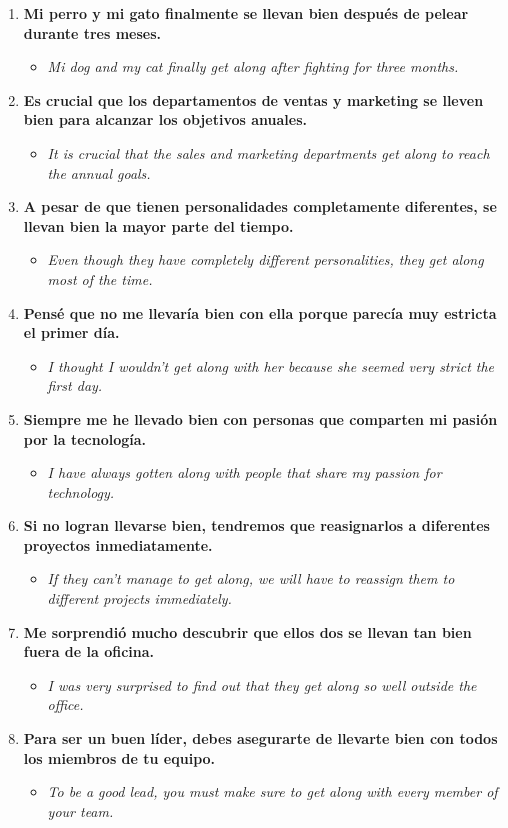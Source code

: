 \documentclass[
10pt, %
a4paper, %
oneside, %
headinclude,footinclude, %
BCOR5mm, %
]{scrartcl}
\begin{document}
\begin{enumerate}
\begin{itemize}
	\end{itemize}
	\item \textbf{Mi perro y mi gato finalmente se llevan bien después de pelear durante tres meses.}
	\begin{itemize}
		\item \textit{Mi dog and my cat finally get along after fighting for three months.}
	\end{itemize}
	\item \textbf{Es crucial que los departamentos de ventas y marketing se lleven bien para alcanzar los objetivos anuales.}
	\begin{itemize}
		\item \textit{It is crucial that the sales and marketing departments get along to reach the annual goals.}
	\end{itemize}
	\item \textbf{A pesar de que tienen personalidades completamente diferentes, se llevan bien la mayor parte del tiempo.}
	\begin{itemize}
		\item \textit{Even though they have completely different personalities, they get along most of the time.}
	\end{itemize}
	\item \textbf{Pensé que no me llevaría bien con ella porque parecía muy estricta el primer día.}
	\begin{itemize}
		\item \textit{I thought I wouldn't get along with her because she seemed very strict the first day.}
	\end{itemize}
	\item \textbf{ Siempre me he llevado bien con personas que comparten mi pasión por la tecnología.}
	\begin{itemize}
		\item \textit{I have always gotten along with people that share my passion for technology.}
	\end{itemize}
	\item \textbf{Si no logran llevarse bien, tendremos que reasignarlos a diferentes proyectos inmediatamente.}
	\begin{itemize}
		\item \textit{If they can't manage to get along, we will have to reassign them to different projects immediately.}
	\end{itemize}
	\item \textbf{Me sorprendió mucho descubrir que ellos dos se llevan tan bien fuera de la oficina.}
	\begin{itemize}
		\item \textit{I was very surprised to find out that they get along so well outside the office. }
	\end{itemize}
	\item \textbf{Para ser un buen líder, debes asegurarte de llevarte bien con todos los miembros de tu equipo.}
	\begin{itemize}
		\item \textit{To be a good lead, you must make sure to get along with every member of your team.}
	\end{itemize}
\end{enumerate}
\end{document}
